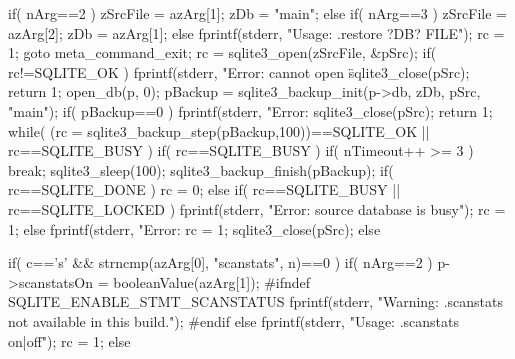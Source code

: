 \begin{Codex}[label=shell.c,numbers=left]
{{    if( nArg==2 ){
      zSrcFile = azArg[1];
      zDb = "main";
    }else if( nArg==3 ){
      zSrcFile = azArg[2];
      zDb = azArg[1];
    }else{
      fprintf(stderr, "Usage: .restore ?DB? FILE\n");
      rc = 1;
      goto meta_command_exit;
    }
    rc = sqlite3_open(zSrcFile, &pSrc);
    if( rc!=SQLITE_OK ){
      fprintf(stderr, "Error: cannot open \"%
      sqlite3_close(pSrc);
      return 1;
    }
    open_db(p, 0);
    pBackup = sqlite3_backup_init(p->db, zDb, pSrc, "main");
    if( pBackup==0 ){
      fprintf(stderr, "Error: %
      sqlite3_close(pSrc);
      return 1;
    }
    while( (rc = sqlite3_backup_step(pBackup,100))==SQLITE_OK
          || rc==SQLITE_BUSY  ){
      if( rc==SQLITE_BUSY ){
        if( nTimeout++ >= 3 ) break;
        sqlite3_sleep(100);
      }
    }
    sqlite3_backup_finish(pBackup);
    if( rc==SQLITE_DONE ){
      rc = 0;
    }else if( rc==SQLITE_BUSY || rc==SQLITE_LOCKED ){
      fprintf(stderr, "Error: source database is busy\n");
      rc = 1;
    }else{
      fprintf(stderr, "Error: %
      rc = 1;
    }
    sqlite3_close(pSrc);
  }else


  if( c=='s' && strncmp(azArg[0], "scanstats", n)==0 ){
    if( nArg==2 ){
      p->scanstatsOn = booleanValue(azArg[1]);
#ifndef SQLITE_ENABLE_STMT_SCANSTATUS
      fprintf(stderr, "Warning: .scanstats not available in this build.\n");
#endif
    }else{
      fprintf(stderr, "Usage: .scanstats on|off\n");
      rc = 1;
    }
  }else

}
\end{Codex}
